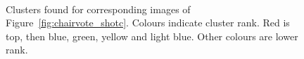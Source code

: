 \documentclass[11pt,a4paper]{kth-mag}
\begin{document}
\begin{figure}[H]
  \centering
  \\
  \caption{Clusters found for corresponding images of
    Figure~\ref{fig:chairvote_shotc}. Colours indicate cluster rank. Red is top,
    then blue, green, yellow and light blue. Other colours are lower rank.}
  \label{fig:chaircluster_shotc}
\end{figure}

\newpage
\end{document}
